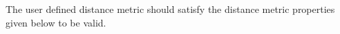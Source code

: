 The user defined distance metric should satisfy the distance metric properties given below to be valid.

